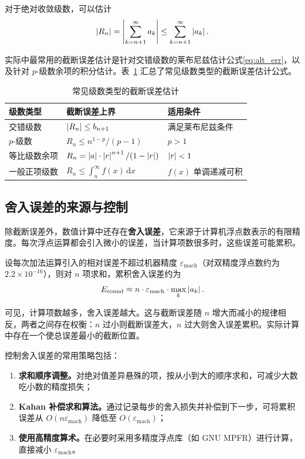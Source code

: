 对于绝对收敛级数，可以估计
\begin{equation}
\left|R_n\right| = \left|\sum_{k=n+1}^{\infty} a_k\right| \leq \sum_{k=n+1}^{\infty} \left|a_k\right|.
\end{equation}

实际中最常用的截断误差估计是针对交错级数的莱布尼兹估计公式\eqref{eq:alt_err}，以及针对 $p$-级数余项的积分估计。表~\ref{tab:trunc_err} 汇总了常见级数类型的截断误差估计公式。

\begin{table}[htbp]
\centering
\caption{常见级数类型的截断误差估计}
\label{tab:trunc_err}
\begin{tabular}{lll}
\toprule
\textbf{级数类型} & \textbf{截断误差上界} & \textbf{适用条件} \\
\midrule
交错级数 & $\left|R_n\right| \leq b_{n+1}$ & 满足莱布尼兹条件 \\
$p$-级数 & $R_n \leq n^{1-p}/(p-1)$ & $p > 1$ \\
等比级数余项 & $R_n = \left|a\right| \cdot \left|r\right|^{n+1}/(1-\left|r\right|)$ & $\left|r\right| < 1$ \\
一般正项级数 & $\displaystyle R_n \leq \int_n^{\infty} f(x)\, \mathrm{d}x$ & $f(x)$ 单调递减可积 \\
\bottomrule
\end{tabular}
\end{table}

\subsection{舍入误差的来源与控制}

除截断误差外，数值计算中还存在\textbf{舍入误差}，它来源于计算机浮点数表示的有限精度。每次浮点运算都会引入微小的误差，当计算项数很多时，这些误差可能累积。

设每次加法运算引入的相对误差不超过机器精度 $\varepsilon_{\mathrm{mach}}$（对双精度浮点数约为 $2.2 \times 10^{-16}$），则对 $n$ 项求和，累积舍入误差约为
\begin{equation}
E_{\text{round}} \approx n \cdot \varepsilon_{\mathrm{mach}} \cdot \max_k \left|a_k\right|.
\end{equation}

可见，计算项数越多，舍入误差越大。这与截断误差随 $n$ 增大而减小的规律相反，两者之间存在权衡：$n$ 过小则截断误差大，$n$ 过大则舍入误差累积。实际计算中存在一个使总误差最小的截断位置。

控制舍入误差的常用策略包括：
\begin{enumerate}[label=（\arabic*）]
  \item \textbf{求和顺序调整。}对绝对值差异悬殊的项，按从小到大的顺序求和，可减少大数吃小数的精度损失；
  \item \textbf{Kahan 补偿求和算法。}通过记录每步的舍入损失并补偿到下一步，可将累积误差从 $O(n\varepsilon_{\mathrm{mach}})$ 降低至 $O(\varepsilon_{\mathrm{mach}})$；
  \item \textbf{使用高精度算术。}在必要时采用多精度浮点库（如 GNU MPFR）进行计算，直接减小 $\varepsilon_{\mathrm{mach}}$。
\end{enumerate}

